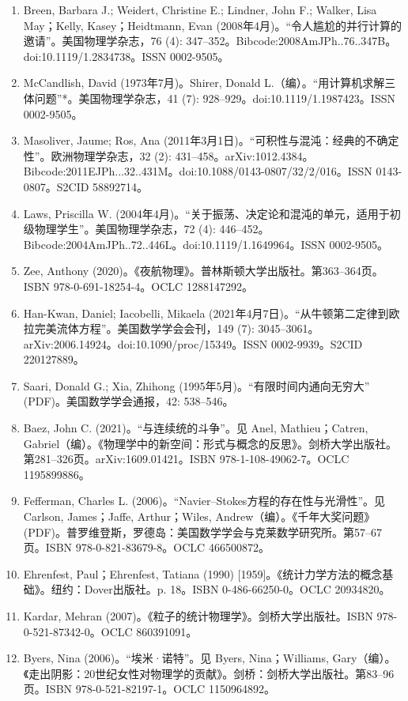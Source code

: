 \begin{enumerate}
\item Breen, Barbara J.; Weidert, Christine E.; Lindner, John F.; Walker, Lisa May；Kelly, Kasey；Heidtmann, Evan (2008年4月)。“令人尴尬的并行计算的邀请”。美国物理学杂志，76 (4): 347–352。Bibcode:2008AmJPh..76..347B。doi:10.1119/1.2834738。ISSN 0002-9505。
\item McCandlish, David (1973年7月)。Shirer, Donald L.（编）。“用计算机求解三体问题”*。美国物理学杂志，41 (7): 928–929。doi:10.1119/1.1987423。ISSN 0002-9505。
\item Masoliver, Jaume; Ros, Ana (2011年3月1日)。“可积性与混沌：经典的不确定性”。欧洲物理学杂志，32 (2): 431–458。arXiv:1012.4384。Bibcode:2011EJPh...32..431M。doi:10.1088/0143-0807/32/2/016。ISSN 0143-0807。S2CID 58892714。
\item Laws, Priscilla W. (2004年4月)。“关于振荡、决定论和混沌的单元，适用于初级物理学生”。美国物理学杂志，72 (4): 446–452。Bibcode:2004AmJPh..72..446L。doi:10.1119/1.1649964。ISSN 0002-9505。
\item Zee, Anthony (2020)。《夜航物理》。普林斯顿大学出版社。第363–364页。ISBN 978-0-691-18254-4。OCLC 1288147292。
\item Han-Kwan, Daniel; Iacobelli, Mikaela (2021年4月7日)。“从牛顿第二定律到欧拉完美流体方程”。美国数学学会会刊，149 (7): 3045–3061。arXiv:2006.14924。doi:10.1090/proc/15349。ISSN 0002-9939。S2CID 220127889。
\item Saari, Donald G.; Xia, Zhihong (1995年5月)。“有限时间内通向无穷大” (PDF)。美国数学学会通报，42: 538–546。
\item Baez, John C. (2021)。“与连续统的斗争”。见 Anel, Mathieu；Catren, Gabriel（编）。《物理学中的新空间：形式与概念的反思》。剑桥大学出版社。第281–326页。arXiv:1609.01421。ISBN 978-1-108-49062-7。OCLC 1195899886。
\item Fefferman, Charles L. (2006)。“Navier–Stokes方程的存在性与光滑性”。见 Carlson, James；Jaffe, Arthur；Wiles, Andrew（编）。《千年大奖问题》 (PDF)。普罗维登斯，罗德岛：美国数学学会与克莱数学研究所。第57–67页。ISBN 978-0-821-83679-8。OCLC 466500872。
\item Ehrenfest, Paul；Ehrenfest, Tatiana (1990) [1959]。《统计力学方法的概念基础》。纽约：Dover出版社。p. 18。ISBN 0-486-66250-0。OCLC 20934820。
\item Kardar, Mehran (2007)。《粒子的统计物理学》。剑桥大学出版社。ISBN 978-0-521-87342-0。OCLC 860391091。
\item Byers, Nina (2006)。“埃米·诺特”。见 Byers, Nina；Williams, Gary（编）。《走出阴影：20世纪女性对物理学的贡献》。剑桥：剑桥大学出版社。第83–96页。ISBN 978-0-521-82197-1。OCLC 1150964892。

\end{enumerate}
